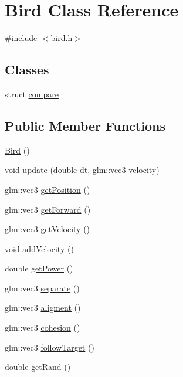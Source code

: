 \hypertarget{classBird}{}\section{Bird Class Reference}
\label{classBird}


{\ttfamily \#include $<$bird.\+h$>$}

\subsection*{Classes}
\begin{DoxyCompactItemize}
\item 
struct \hyperlink{structBird_1_1compare}{compare}
\end{DoxyCompactItemize}
\subsection*{Public Member Functions}
\begin{DoxyCompactItemize}
\item 
\hyperlink{classBird_a7c1b36856fe3a89d6098ec2b8a10ae8d}{Bird} ()
\item 
void \hyperlink{classBird_a3ff2e32d861a71e89c1294e0e19e91de}{update} (double dt, glm\+::vec3 velocity)
\item 
glm\+::vec3 \hyperlink{classBird_a4611f1cf5c173562bb4c14fe719f20fa}{get\+Position} ()
\item 
glm\+::vec3 \hyperlink{classBird_ad212b0b56ce7a244c02c78811fcc7a7c}{get\+Forward} ()
\item 
glm\+::vec3 \hyperlink{classBird_ac2e4e44987731d67de77e2a18245024d}{get\+Velocity} ()
\item 
void \hyperlink{classBird_a17574e6ab712a32bec19ba9b709bf903}{add\+Velocity} ()
\item 
double \hyperlink{classBird_a25cc8f4de5f1662fa56001531608fac9}{get\+Power} ()
\item 
glm\+::vec3 \hyperlink{classBird_a7f02b8f1ed943dd812b483a6361d81e2}{separate} ()
\item 
glm\+::vec3 \hyperlink{classBird_a41caabaf3f9fb37d0583f6384f12d9a1}{aligment} ()
\item 
glm\+::vec3 \hyperlink{classBird_ae30d88996b92134ab8acb4105766a5cb}{cohesion} ()
\item 
glm\+::vec3 \hyperlink{classBird_a6383559729a95495285d246f910fe37e}{follow\+Target} ()
\item 
double \hyperlink{classBird_a29d1ab4b40b2f9394f575019e3f8a247}{get\+Rand} ()
\end{DoxyCompactItemize}
